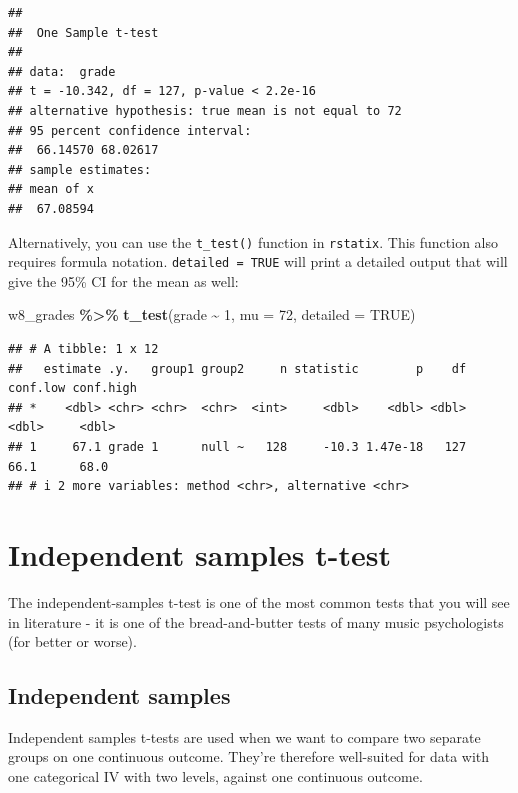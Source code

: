 \documentclass[
]{book}
\newenvironment{Shaded}{\begin{snugshade}}{\end{snugshade}}
\newcommand{\AttributeTok}[1]{\textcolor[rgb]{0.13,0.29,0.53}{#1}}
\newcommand{\ConstantTok}[1]{\textcolor[rgb]{0.56,0.35,0.01}{#1}}
\newcommand{\DecValTok}[1]{\textcolor[rgb]{0.00,0.00,0.81}{#1}}
\newcommand{\FunctionTok}[1]{\textcolor[rgb]{0.13,0.29,0.53}{\textbf{#1}}}
\newcommand{\NormalTok}[1]{#1}
\newcommand{\SpecialCharTok}[1]{\textcolor[rgb]{0.81,0.36,0.00}{\textbf{#1}}}
\begin{document}
\begin{verbatim}
## 
##  One Sample t-test
## 
## data:  grade
## t = -10.342, df = 127, p-value < 2.2e-16
## alternative hypothesis: true mean is not equal to 72
## 95 percent confidence interval:
##  66.14570 68.02617
## sample estimates:
## mean of x 
##  67.08594
\end{verbatim}

Alternatively, you can use the \texttt{t\_test()} function in \texttt{rstatix}. This function also requires formula notation. \texttt{detailed\ =\ TRUE} will print a detailed output that will give the 95\% CI for the mean as well:

\begin{Shaded}
\begin{Highlighting}[]
\NormalTok{w8\_grades }\SpecialCharTok{\%\textgreater{}\%}
  \FunctionTok{t\_test}\NormalTok{(grade }\SpecialCharTok{\textasciitilde{}} \DecValTok{1}\NormalTok{, }\AttributeTok{mu =} \DecValTok{72}\NormalTok{, }\AttributeTok{detailed =} \ConstantTok{TRUE}\NormalTok{)}
\end{Highlighting}
\end{Shaded}

\begin{verbatim}
## # A tibble: 1 x 12
##   estimate .y.   group1 group2     n statistic        p    df conf.low conf.high
## *    <dbl> <chr> <chr>  <chr>  <int>     <dbl>    <dbl> <dbl>    <dbl>     <dbl>
## 1     67.1 grade 1      null ~   128     -10.3 1.47e-18   127     66.1      68.0
## # i 2 more variables: method <chr>, alternative <chr>
\end{verbatim}

\section{Independent samples t-test}\label{independent-samples-t-test}

The independent-samples t-test is one of the most common tests that you will see in literature - it is one of the bread-and-butter tests of many music psychologists (for better or worse).

\subsection{Independent samples}\label{independent-samples}

Independent samples t-tests are used when we want to compare two separate groups on one continuous outcome. They're therefore well-suited for data with one categorical IV with two levels, against one continuous outcome.
\end{document}
